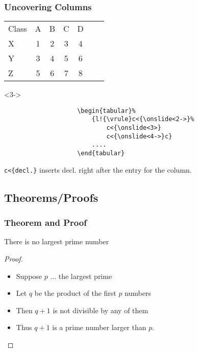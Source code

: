 \begin{frame}[fragile]
	\frametitle{Uncovering Columns}
	
	\begin{tabular}{l!{\vrule}c<{\onslide<2->}c<{\onslide<3>}c<{\onslide<4->}c<{\onslide<5->}c<{\onslide}c}
		Class &	A &	 B &	 C &	 D\\
		X &	1 &	 2 &	3 &	4\\
		Y &	 3 &	 4 &	 5 &	6\\
		Z &     5 &	6 &	7 &	8
	\end{tabular}
	
	\begin{uncoverenv}<3->
		{{\begin{verbatim}
					\begin{tabular}% 
						{l!{\vrule}c<{\onslide<2->}%
							c<{\onslide<3>}
							c<{\onslide<4->}c}
						....
					\end{tabular}
		\end{verbatim}}}
	\end{uncoverenv}
	\alert<4->{\texttt{\blue c<\{decl.\}} inserts decl. right after the entry for the column.}
\end{frame}


\subsection{Theorems/Proofs}

\begin{frame}
	\frametitle{Theorem and Proof}
	\begin{theorem}
		There is no largest prime number 
	\end{theorem}
	
	\begin{proof}
		\begin{itemize}
			\item Suppose $p$ ... the largest prime\pause
			\item Let $q$ be the product of the first $p$ numbers\pause
			\item Then $q+1$ is not divisible by any of them\pause
			\item Thus $q+1$ is a prime number larger than $p$.\pause
		\end{itemize}
		
	\end{proof}
\end{frame}



